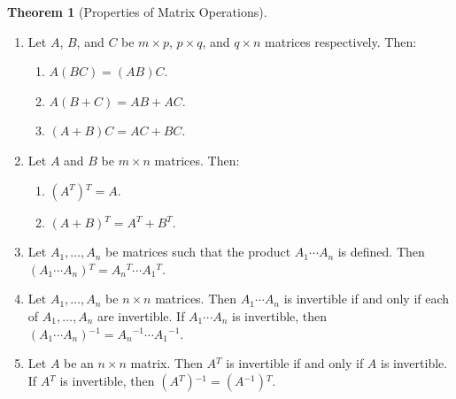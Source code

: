 \documentclass{myart}
\renewcommand{\vec}[1]{\ensuremath{\mathbf{#1}}} %
\newcommand{\mat}[1]{\ensuremath{#1}} %
\newcommand{\by}{\ensuremath{\times}} %
\newcommand{\inv}{\ensuremath{^{-1}}} %
\newcommand{\trans}{\ensuremath{^T}} %
\newcommand{\many}[2][n]{\ensuremath{{#2}_1, \ldots, {#2}_{#1}}} %
\theoremstyle{definition}
\newtheorem{thm}{Theorem}
\begin{document}
\begin{thm}[Properties of Matrix Operations] \hfill
\begin{enumerate}
\item Let \mat A, \mat B, and \mat C be $m \by p$, $p \by q$, and $q \by n$ matrices respectively. Then:
\begin{enumerate}
\item $\mat A (\mat B \mat C) = (\mat A \mat B) \mat C$.
\item $\mat A (\mat B + \mat C) = \mat A \mat B + \mat A \mat C$.
\item $(\mat A + \mat B) \mat C = \mat A \mat C + \mat B \mat C$.
\end{enumerate}
\item Let \mat A and \mat B be $m \by n$ matrices. Then:
\begin{enumerate}
\item $(\mat A\trans)\trans = \mat A$.
\item $(\mat A + \mat B)\trans = \mat A\trans + \mat B\trans$.
\end{enumerate}
\item Let \many{\mat A} be matrices such that the product $\mat A_1 \cdots \mat A_n$ is defined. Then $(\mat A_1 \cdots \mat A_n)\trans = \mat A_n\trans \cdots \mat A_1\trans$.
\item Let \many{\mat A} be $n \by n$ matrices. Then $\mat A_1 \cdots \mat A_n$ is invertible if and only if each of \many{\mat A} are invertible. If $\mat A_1 \cdots \mat A_n$ is invertible, then $(\mat A_1 \cdots \mat A_n)\inv = \mat A_n\inv \cdots \mat A_1\inv$.
\item Let \mat A be an $n \by n$ matrix. Then $\mat A\trans$ is invertible if and only if \mat A is invertible. If $\mat A\trans$ is invertible, then $(\mat A\trans)\inv = (\mat A\inv)\trans$.
\end{enumerate}
\end{thm}
\end{document}
